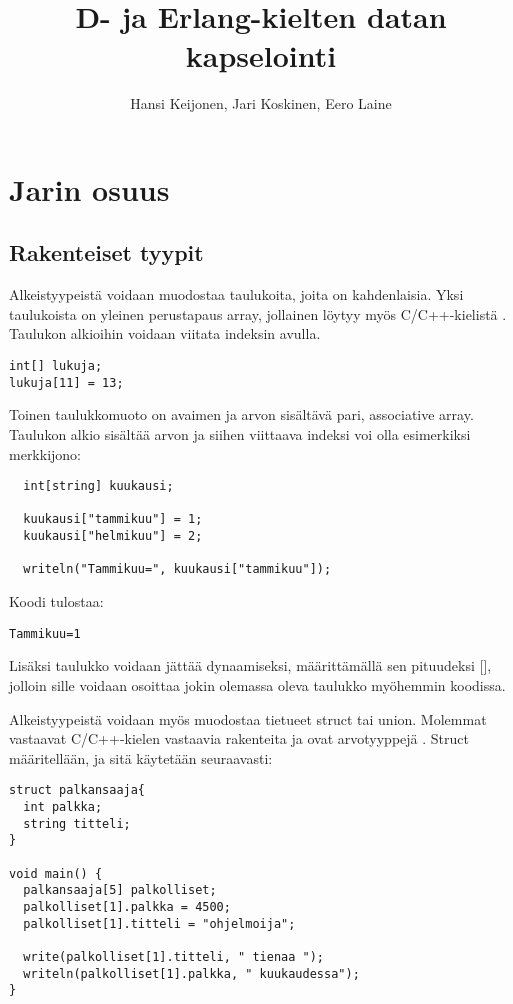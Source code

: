 \documentclass[11pt,oneside,a4paper]{article}
\title{D- ja Erlang-kielten datan kapselointi}
\author{Hansi Keijonen, Jari Koskinen, Eero Laine}
\begin{document}
\maketitle

\newpage

\section{Jarin osuus}
\subsection{Rakenteiset tyypit}
Alkeistyypeistä voidaan muodostaa taulukoita, joita on kahdenlaisia. Yksi taulukoista on yleinen perustapaus array, jollainen löytyy myös C/C++-kielistä \cite{KRR88}. Taulukon alkioihin voidaan viitata indeksin avulla.
\begin{verbatim}
int[] lukuja;
lukuja[11] = 13;
\end{verbatim}

Toinen taulukkomuoto on avaimen ja arvon sisältävä pari, associative array. Taulukon alkio sisältää arvon ja siihen viittaava indeksi voi olla esimerkiksi merkkijono: 
\begin{verbatim}
  int[string] kuukausi;
  
  kuukausi["tammikuu"] = 1;
  kuukausi["helmikuu"] = 2;
  
  writeln("Tammikuu=", kuukausi["tammikuu"]);
\end{verbatim}
Koodi tulostaa:
\begin{verbatim}
Tammikuu=1
\end{verbatim}

Lisäksi taulukko voidaan jättää dynaamiseksi, määrittämällä sen pituudeksi [], jolloin sille voidaan osoittaa jokin olemassa oleva taulukko myöhemmin koodissa.

Alkeistyypeistä voidaan myös muodostaa tietueet struct tai union. Molemmat vastaavat C/C++-kielen vastaavia rakenteita \cite{KRR88} ja ovat arvotyyppejä \cite{DLA13}. Struct määritellään, ja sitä käytetään seuraavasti:

\begin{verbatim}
struct palkansaaja{
  int palkka;
  string titteli;
}

void main() {
  palkansaaja[5] palkolliset;
  palkolliset[1].palkka = 4500;
  palkolliset[1].titteli = "ohjelmoija";

  write(palkolliset[1].titteli, " tienaa ");
  writeln(palkolliset[1].palkka, " kuukaudessa");
}
\end{verbatim}
\end{document}
